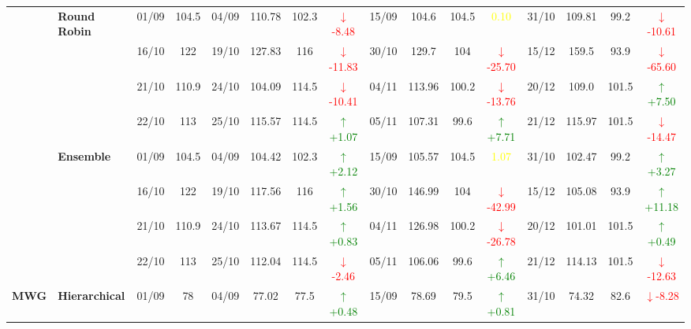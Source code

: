 \documentclass{ieeeaccess}
\begin{document}
{\begin{longtable}{llcc|cccc|cccc|cccc}
& \textbf{Round Robin}
& 01/09 & 104.5 & 04/09 & 110.78 & 102.3 & \textcolor{red}{\(\downarrow\)-8.48} & 15/09 & 104.6 & 104.5 & \textcolor{yellow}{0.10} & 31/10 & 109.81 & 99.2 & \textcolor{red}{\(\downarrow\)-10.61} \\

&
& 16/10 & 122 & 19/10 & 127.83 & 116 & \textcolor{red}{\(\downarrow\)-11.83} & 30/10 & 129.7 & 104 & \textcolor{red}{\(\downarrow\)-25.70} & 15/12 & 159.5 & 93.9 & \textcolor{red}{\(\downarrow\)-65.60} \\

&
& 21/10 & 110.9 & 24/10 & 104.09 & 114.5 & \textcolor{red}{\(\downarrow\)-10.41} & 04/11 & 113.96 & 100.2 & \textcolor{red}{\(\downarrow\)-13.76} & 20/12 & 109.0 & 101.5 & \textcolor{green}{\(\uparrow\)+7.50} \\

&
& 22/10 & 113 & 25/10 & 115.57 & 114.5 & \textcolor{green}{\(\uparrow\)+1.07} & 05/11 & 107.31 & 99.6 & \textcolor{green}{\(\uparrow\)+7.71} & 21/12 & 115.97 & 101.5 & \textcolor{red}{\(\downarrow\)-14.47} \\
\cmidrule(lr){2-16}


& \textbf{Ensemble}
& 01/09 & 104.5 & 04/09 & 104.42 & 102.3 & \textcolor{green}{\(\uparrow\)+2.12} & 15/09 & 105.57 & 104.5 & \textcolor{yellow}{1.07} & 31/10 & 102.47 & 99.2 & \textcolor{green}{\(\uparrow\)+3.27} \\

&
& 16/10 & 122 & 19/10 & 117.56 & 116 & \textcolor{green}{\(\uparrow\)+1.56} & 30/10 & 146.99 & 104 & \textcolor{red}{\(\downarrow\)-42.99} & 15/12 & 105.08 & 93.9 & \textcolor{green}{\(\uparrow\)+11.18} \\

&
& 21/10 & 110.9 & 24/10 & 113.67 & 114.5 & \textcolor{green}{\(\uparrow\)+0.83} & 04/11 & 126.98 & 100.2 & \textcolor{red}{\(\downarrow\)-26.78} & 20/12 & 101.01 & 101.5 & \textcolor{green}{\(\uparrow\)+0.49} \\

&
& 22/10 & 113 & 25/10 & 112.04 & 114.5 & \textcolor{red}{\(\downarrow\)-2.46} & 05/11 & 106.06 & 99.6 & \textcolor{green}{\(\uparrow\)+6.46} & 21/12 & 114.13 & 101.5 & \textcolor{red}{\(\downarrow\)-12.63} \\
\midrule




\multirow{12}{*}{\textbf{MWG}} 
& \textbf{Hierarchical}
& 01/09 & 78 & 04/09 & 77.02 & 77.5 & \textcolor{green}{\(\uparrow\)+0.48} & 15/09 & 78.69 & 79.5 & \textcolor{green}{\(\uparrow\)+0.81} & 31/10 & 74.32 & 82.6 & \textcolor{red}{\(\downarrow\)-8.28} \\


\end{longtable}}
\end{document}
